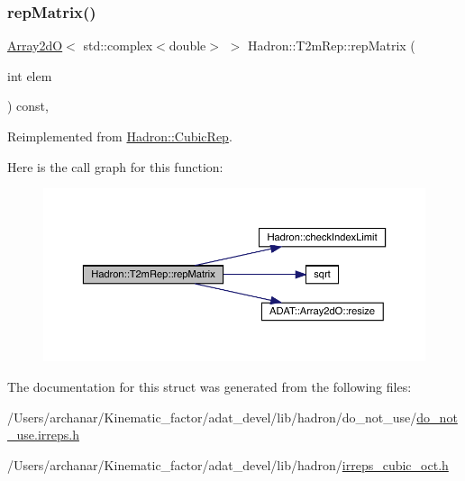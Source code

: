 \subsubsection{\texorpdfstring{repMatrix()}{repMatrix()}\hspace{0.1cm}{\footnotesize\ttfamily [2/2]}}
{\footnotesize\ttfamily \mbox{\hyperlink{classADAT_1_1Array2dO}{Array2dO}}$<$ std\+::complex$<$double$>$ $>$ Hadron\+::\+T2m\+Rep\+::rep\+Matrix (\begin{DoxyParamCaption}\item[{int}]{elem }\end{DoxyParamCaption}) const\hspace{0.3cm}{\ttfamily [inline]}, {\ttfamily [virtual]}}



Reimplemented from \mbox{\hyperlink{structHadron_1_1CubicRep_ac5d7e9e6f4ab1158b5fce3e4ad9e8005}{Hadron\+::\+Cubic\+Rep}}.

Here is the call graph for this function\+:
\nopagebreak
\begin{figure}[H]
\begin{center}
\leavevmode
\includegraphics[width=350pt]{d7/dc8/structHadron_1_1T2mRep_a19df67dde8ae1b7f7436559ee5218f13_cgraph}
\end{center}
\end{figure}


The documentation for this struct was generated from the following files\+:\begin{DoxyCompactItemize}
\item 
/\+Users/archanar/\+Kinematic\+\_\+factor/adat\+\_\+devel/lib/hadron/do\+\_\+not\+\_\+use/\mbox{\hyperlink{do__not__use_8irreps_8h}{do\+\_\+not\+\_\+use.\+irreps.\+h}}\item 
/\+Users/archanar/\+Kinematic\+\_\+factor/adat\+\_\+devel/lib/hadron/\mbox{\hyperlink{lib_2hadron_2irreps__cubic__oct_8h}{irreps\+\_\+cubic\+\_\+oct.\+h}}\end{DoxyCompactItemize}
